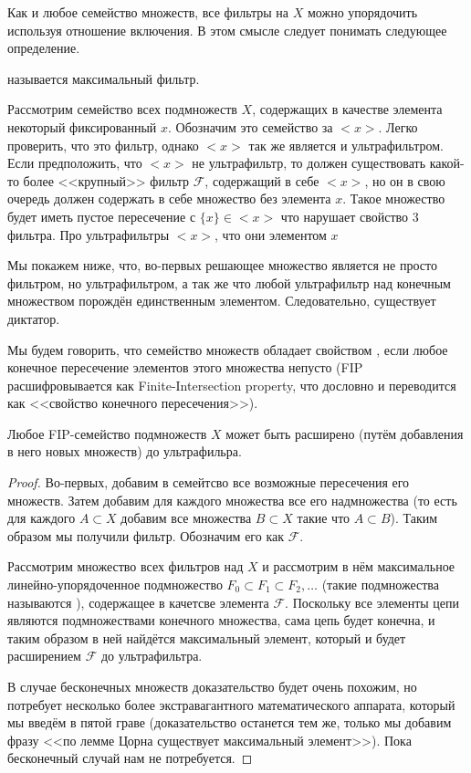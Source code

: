 Как и любое семейство множеств, все фильтры на $X$ можно упорядочить используя отношение включения. В этом смысле следует понимать следующее определение.

\begin{definition}
 называется максимальный фильтр.
\end{definition}

\begin{example}
Рассмотрим семейство всех подмножеств $X$, содержащих в качестве элемента некоторый фиксированный $x$. Обозначим это семейство за $<x>$. Легко проверить, что это фильтр, однако $<x>$ так же является и ультрафильтром. Если предположить, что $<x>$ не ультрафильтр, то должен существовать какой-то более <<крупный>> фильтр $\mathcal{F}$, содержащий в себе $<x>$, но он в свою очередь должен содержать в себе множество без элемента $x$. Такое множество будет иметь пустое пересечение с $\{x\}\in<x>$ что нарушает свойство 3 фильтра. Про ультрафильтры $<x>$, что они  элементом $x$
\end{example}

Мы покажем ниже, что, во-первых решающее множество является не просто фильтром, но ультрафильтром, а так же что любой ультрафильтр над конечным множеством порождён единственным элементом. Следовательно, существует диктатор.

\begin{definition}
Мы будем говорить, что семейство множеств обладает свойством , если любое конечное пересечение элементов этого множества непусто (FIP расшифровывается как Finite-Intersection property, что дословно и переводится как <<свойство конечного пересечения>>).
\end{definition}

\begin{lemma}
Любое FIP-семейство подмножеств $X$ может быть расширено (путём добавления в него новых множеств) до ультрафильра.
\end{lemma}
\begin{proof}
Во-первых, добавим в семейтсво все возможные пересечения его множеств. Затем добавим для каждого множества все его надмножества (то есть для каждого $A\subset X$ добавим все множества $B\subset X$ такие что $A\subset B$). Таким образом мы получили фильтр. Обозначим его как $\mathcal{F}$.

Рассмотрим множество всех фильтров над $X$ и рассмотрим в нём максимальное линейно-упорядоченное подмножество $F_0\subset F_1\subset F_2, \ldots$ (такие подмножества называются ), содержащее в качетсве элемента $\mathcal{F}$. Поскольку все элементы цепи являются подмножествами конечного множества, сама цепь будет конечна, и таким образом в ней найдётся максимальный элемент, который и будет расширением $\mathcal{F}$ до ультрафильтра.

В случае бесконечных множеств доказательство будет очень похожим, но потребует несколько более экстравагантного математического аппарата, который мы введём в пятой граве (доказательство останется тем же, только мы добавим фразу <<по лемме Цорна существует максимальный элемент>>). Пока бесконечный случай нам не потребуется.
\end{proof}

